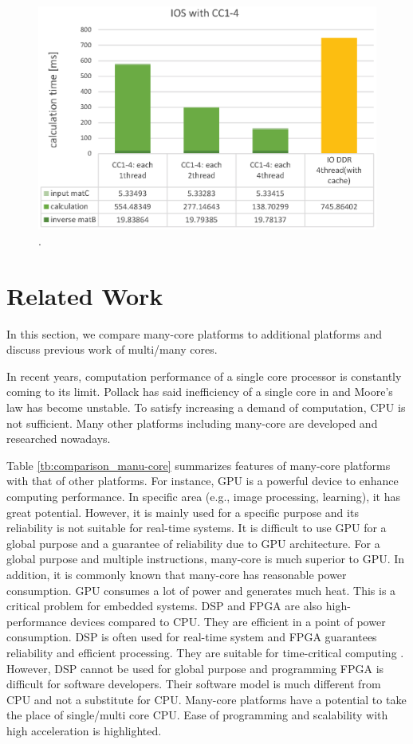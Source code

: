 \documentclass{sig-alternate-05-2015}
\begin{document}
\begin{figure}[t]
  \centering
  \includegraphics[width=1.0\linewidth]{../figure/BarGraph_matrix_with_CCs.eps}
  \caption{\label{fig:}
    .}
\end{figure}


\section{Related Work}
\label{sec:related work}
In this section, we compare many-core platforms to additional platforms and discuss previous work of multi/many cores.

In recent years, computation performance of a single core processor is constantly coming to its limit.
Pollack has said inefficiency of a single core in \cite{pollack1999new} and Moore's law \cite{moore2006cramming} has become unstable.
To satisfy increasing a demand of computation, CPU is not sufficient.
Many other platforms including many-core are developed and researched nowadays.

Table \ref{tb:comparison_manu-core} summarizes features of many-core platforms with that of other platforms.
For instance, GPU is a powerful device to enhance computing performance.
In specific area (e.g., image processing, learning), it has great potential.
However, it is mainly used for a specific purpose and its reliability is not suitable for real-time systems.
It is difficult to use GPU for a global purpose and a guarantee of reliability due to GPU architecture.
For a global purpose and multiple instructions, many-core is much superior to GPU.
In addition, it is commonly known that many-core has reasonable power consumption.
GPU consumes a lot of power and generates much heat.
This is a critical problem for embedded systems.
DSP and FPGA are also high-performance devices compared to CPU.
They are efficient in a point of power consumption.
DSP is often used for real-time system and FPGA guarantees reliability and efficient processing.
They are suitable for time-critical computing \cite{de2015kalray}.
However, DSP cannot be used for global purpose and programming FPGA is difficult for software developers.
Their software model is much different from CPU and not a substitute for CPU.
Many-core platforms have a potential to take the place of single/multi core CPU.
Ease of programming and scalability with high acceleration is highlighted.
\end{document}
